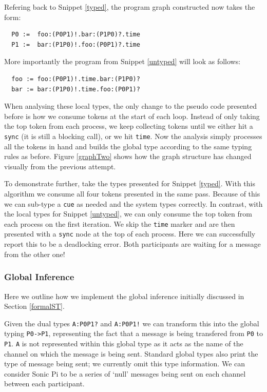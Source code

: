 \documentclass[11pt, abstracton, twoside, titlepage=true]{scrartcl}
\begin{document}
Refering back to Snippet \ref{typed}, the program graph constructed now takes
the form:
\\
\begin{lstlisting}
  P0 :=  foo:(P0P1)!.bar:(P1P0)?.time
  P1 :=  bar:(P1P0)!.foo:(P0P1)?.time
\end{lstlisting}

More importantly the program from Snippet \ref{untyped} will look as follows:
\\
\begin{lstlisting}
  foo := foo:(P0P1)!.time.bar:(P1P0)?
  bar := bar:(P1P0)!.time.foo:(P0P1)?
\end{lstlisting}

When analysing these local types, the only change to the pseudo code presented before 
is how we consume tokens at the start of each loop. Instead of only taking the 
top token from each process, we keep collecting tokens until we either hit a 
\texttt{sync} (it is still a blocking call), or we hit \texttt{time}. Now the analysis 
simply processes all the tokens in hand and builds the global type according to the 
same typing rules as before. Figure \ref{graphTwo} shows how the graph structure 
has changed visually from the previous attempt.

To demonstrate further, take the types presented for Snippet \ref{typed}. With this 
algorithm we consume all four tokens presented in the same pass. Because of this we 
can sub-type a \texttt{cue} as needed and the system types correctly. In contrast, 
with the local types for Snippet \ref{untyped}, we can only consume the top token 
from each process on the first iteration. We skip the \texttt{time} marker and are 
then presented with a \texttt{sync} node at the top of each process. Here we can 
successfully report this to be a deadlocking error. Both participants are waiting for a 
message from the other one!


\subsubsection{Global Inference} \label{inference}
Here we outline how we implement the global inference initially discussed in Section 
\ref{formalST}. 

Given the dual types \texttt{A:P0P1?} and \texttt{A:P0P1!} we can transform 
this into the global typing \texttt{P0->P1}, representing the fact that a 
message is being transfered from \texttt{P0} to \texttt{P1}. \texttt{A} is not
represented within this global type as it acts as the name of the channel on
which the message is being sent. Standard global types also print the type of 
message being sent; we currently omit this type information. We can consider Sonic 
Pi to be a series of `null' messages being sent on each channel between each 
participant.
\end{document}
